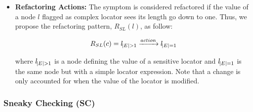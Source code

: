 \begin{itemize}
    \item \textbf{Refactoring Actions:} The symptom is considered refactored if the value of a node $l$ flagged as complex locator sees its length go down to one. Thus, we propose the refactoring pattern, $R_{SL}(l)$, as follow:
    
    \begin{equation*}
        R_{SL}(c) = l_{\abs{E} > 1} \xrightarrow{action} l_{\abs{E} = 1}
    \end{equation*}
    
    where $l_{\abs{E} > 1}$ is a node defining the value of a sensitive locator and $l_{\abs{E} = 1}$ is the same node but with a simple locator expression. Note that a change is only accounted for when the value of the locator is modified.
\end{itemize}

\subsubsection{Sneaky Checking (SC)}


